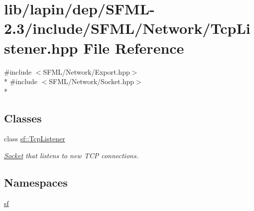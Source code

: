 \hypertarget{lapin_2dep_2_s_f_m_l-2_83_2include_2_s_f_m_l_2_network_2_tcp_listener_8hpp}{\section{lib/lapin/dep/\-S\-F\-M\-L-\/2.3/include/\-S\-F\-M\-L/\-Network/\-Tcp\-Listener.hpp File Reference}
\label{lapin_2dep_2_s_f_m_l-2_83_2include_2_s_f_m_l_2_network_2_tcp_listener_8hpp}
}
{\ttfamily \#include $<$S\-F\-M\-L/\-Network/\-Export.\-hpp$>$}\\*
{\ttfamily \#include $<$S\-F\-M\-L/\-Network/\-Socket.\-hpp$>$}\\*
\subsection*{Classes}
\begin{DoxyCompactItemize}
\item 
class \hyperlink{classsf_1_1_tcp_listener}{sf\-::\-Tcp\-Listener}
\begin{DoxyCompactList}\small\item\em \hyperlink{classsf_1_1_socket}{Socket} that listens to new T\-C\-P connections. \end{DoxyCompactList}\end{DoxyCompactItemize}
\subsection*{Namespaces}
\begin{DoxyCompactItemize}
\item 
\hyperlink{namespacesf}{sf}
\end{DoxyCompactItemize}
